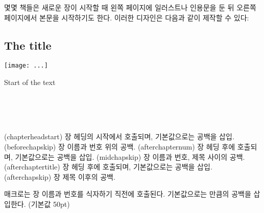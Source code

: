 몇몇 책들은 새로운 장이 시작할 때 왼쪽 페이지에 일러스트나
인용문을 둔 뒤 오른쪽 페이지에서 본문을 시작하기도 한다.
이러한 디자인은 다음과 같이 제작할 수 있다:
\begin{lcode}
\openleft                %
\chapter{The title}      %
\begin{centering}        %
\texttt{[image: ...]}
\end{centering}
\clearpage               %
Start of the text        %
\end{lcode}


\begin{syntax}
\cmd{\chapterheadstart} \lnc{\beforechapskip} \\
\cmd{\afterchapternum} \lnc{\midchapskip} \\
\cmd{\afterchaptertitle} \lnc{\afterchapskip} \\
\end{syntax}
\glossary(chapterheadstart)%
  {}%
  {장 헤딩의 시작에서 호출되며, 기본값으로는  공백을 삽입.}
\glossary(beforechapskip)%
  {}%
  {장 이름과 번호 위의 공백.}
\glossary(afterchapternum)%
  {}%
  {장 헤딩 후에 호출되며, 기본값으로는  공백을 삽입.}
\glossary(midchapskip)%
  {}%
  {장 이름과 번호, 제목 사이의 공백.}
\glossary(afterchaptertitle)%
  {}%
  {장 헤딩 후에 호출되며, 기본값으로는  공백을 삽입.}
\glossary(afterchapskip)%
  {}%
  {장 제목 이후의 공백.}

\cmd{\chapterheadstart} 매크로는 장 이름과 번호를 식자하기 직전에 호출된다.
기본값으로는 \lnc{\beforechapskip} 만큼의 공백을 삽입한다. (기본값 50pt)

